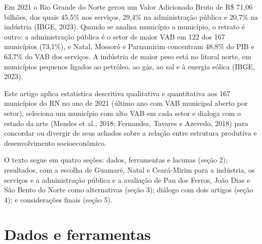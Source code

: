 \documentclass[12pt,a4paper]{article}
\begin{document}
Em 2021 o Rio Grande do Norte gerou um Valor Adicionado Bruto de R\$ 71,06 bilhões, dos quais 45,5\% nos serviços, 29,4\% na administração pública e 20,7\% na indústria (IBGE, 2023). Quando se analisa município a município, o retrato é outro: a administração pública é o setor de maior VAB em 122 dos 167 municípios (73,1\%), e Natal, Mossoró e Parnamirim concentram 48,8\% do PIB e 63,7\% do VAB dos serviços. A indústria de maior peso está no litoral norte, em municípios pequenos ligados ao petróleo, ao gás, ao sal e à energia eólica (IBGE, 2023).

Este artigo aplica estatística descritiva qualitativa e quantitativa aos 167 municípios do RN no ano de 2021 (último ano com VAB municipal aberto por setor), seleciona um município com alto VAB em cada setor e dialoga com o estado da arte (Mendes et al., 2018; Fernandes, Tavares e Azevedo, 2018) para concordar ou divergir de seus achados sobre a relação entre estrutura produtiva e desenvolvimento socioeconômico.

O texto segue em quatro seções: dados, ferramentas e lacunas (seção 2); resultados, com a escolha de Guamaré, Natal e Ceará-Mirim para a indústria, os serviços e a administração pública e a avaliação de Pau dos Ferros, João Dias e São Bento do Norte como alternativas (seção 3); diálogo com dois artigos (seção 4); e considerações finais (seção 5).

\section{Dados e ferramentas}
\end{document}
